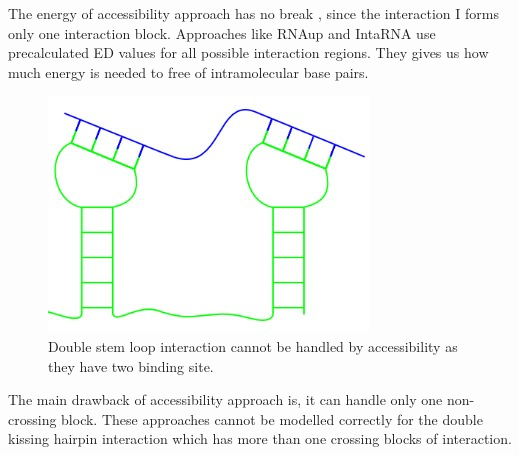 \documentclass[twoside,a4paper]{report}
\begin{document}
	The energy of accessibility approach has no break , since the interaction I forms only one interaction block. Approaches like RNAup and IntaRNA use precalculated ED values for all possible interaction regions. They gives us how much energy is needed to free of intramolecular base pairs. \\
	
		\begin{figure}[tb]
		\includegraphics[width=0.4\linewidth]{doublestem}
		\centering
		\caption{ Double stem loop interaction cannot be handled by accessibility as they have two binding site.} 
		\label{fig:doublestem}
	\end{figure}
	
	
	The main drawback of accessibility approach is, it can handle only one non-crossing block. These approaches cannot be modelled correctly for the double kissing hairpin interaction which has more than one crossing blocks of interaction.\\
	
	
\end{document}
